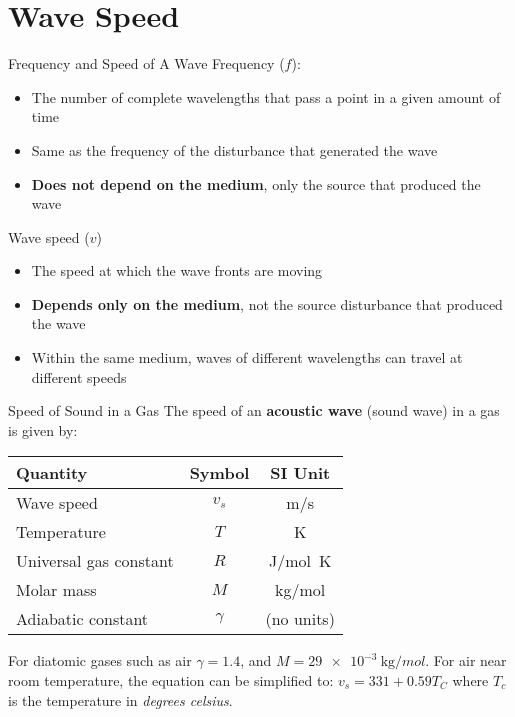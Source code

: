 \documentclass[12pt,aspectratio=169]{beamer}
\newcommand{\eq}[2]{\vspace{#1}{\Large\begin{displaymath}#2\end{displaymath}}}
\begin{document}
\section{Wave Speed}

\begin{frame}{Frequency and Speed of A Wave}
  Frequency ($f$):
  \begin{itemize}
  \item The number of complete wavelengths that pass a point in a given amount
    of time
  \item Same as the frequency of the disturbance that generated the wave
  \item\textbf{Does not depend on the medium}, only the source that produced
    the wave
  \end{itemize}

  \vspace{.2in}Wave speed ($v$)
  \begin{itemize}
  \item The speed at which the wave fronts are moving
  \item \textbf{Depends only on the medium}, not the source disturbance that
    produced the wave
  \item Within the same medium, waves of different wavelengths can travel
    at different speeds
  \end{itemize}
\end{frame}



\begin{frame}{Speed of Sound in a Gas}
  The speed of an \textbf{acoustic wave} (sound wave) in a gas is given by:
  
  \eq{-.2in}{
    \boxed{v_s=\sqrt{\frac{\gamma RT}{M}}}
  }
  \begin{center}
    \begin{tabular}{l|c|c}
      \rowcolor{pink}
      \textbf{Quantity} & \textbf{Symbol} & \textbf{SI Unit} \\ \hline
      Wave speed             & $v_s$    & \si{m/s}\\
      Temperature            & $T$      & \si{\kelvin}\\
      Universal gas constant & $R$      & \si{J/mol.K}\\
      Molar mass             & $M$      & \si{\kilo\gram/mol}\\
      Adiabatic constant     & $\gamma$ & (no units)
    \end{tabular}
  \end{center}
  For diatomic gases such as air $\gamma=1.4$, and
  $M=\SI{29e-3}{\kilo\gram/mol}$. For air near room temperature, the equation
  can be simplified to: $\boxed{v_s=331+0.59T_C}$ where $T_c$ is the
  temperature in \emph{degrees celsius}.
\end{frame}
\end{document}
